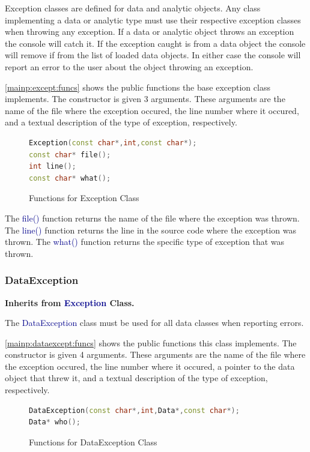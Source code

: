 \documentclass[10pt]{article}
\providecommand{\h}[1]{\textcolor{darkblue}{#1}}
\begin{document}
Exception classes are defined for data and analytic objects. Any class 
implementing a data or analytic type must use their respective exception 
classes when throwing any exception. If a data or analytic object throws an 
exception the console will catch it. If the exception caught is from a data 
object the console will remove if from the list of loaded data objects. In 
either case the console will report an error to the user about the object 
throwing an exception.

\autoref{mainp:except:funcs} shows the public functions the base exception 
class implements. The constructor is given 3 arguments. These arguments are the 
name of the file where the exception occured, the line number where it occured, 
and a textual description of the type of exception, respectively.

\begin{figure}[H]
\begin{mdframed}[style=functions]
\begin{lstlisting}[language=C++]
Exception(const char*,int,const char*);
const char* file();
int line();
const char* what();
\end{lstlisting}
\end{mdframed}
\caption{Functions for Exception Class}
\label{mainp:except:funcs}
\end{figure}

The \h{file()} function returns the name of the file where the exception was 
thrown. The \h{line()} function returns the line in the source code where the 
exception was thrown. The \h{what()} function returns the specific type of 
exception that was thrown.

\subsubsection{DataException}

\textbf{Inherits from \h{Exception} Class.}

The \h{DataException} class must be used for all data classes when reporting 
errors.

\autoref{mainp:dataexcept:funcs} shows the public functions this class 
implements. The constructor is given 4 arguments. These arguments are the name 
of the file where the exception occured, the line number where it occured, a 
pointer to the data object that threw it, and a textual description of the type 
of exception, respectively.

\begin{figure}[H]
\begin{mdframed}[style=functions]
\begin{lstlisting}[language=C++]
DataException(const char*,int,Data*,const char*);
Data* who();
\end{lstlisting}
\end{mdframed}
\caption{Functions for DataException Class}
\label{mainp:dataexcept:funcs}
\end{figure}
\end{document}
